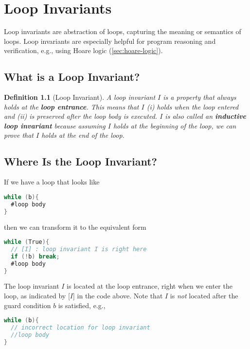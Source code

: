 \documentclass[oneside,11pt,dvipsnames]{book}
\newtheorem{definition}{Definition}[section]
\begin{document}

    

\chapter{Loop Invariants}

Loop invariants are abstraction of loops, capturing the meaning or semantics of loops. Loop invariants are especially helpful for program reasoning and verification, e.g., using Hoare logic (\autoref{sec:hoare-logic}).


\section{What is a Loop Invariant?}\label{what-is-a-loop-invariant}

\begin{definition}[Loop Invariant]
A loop invariant $I$ is a property that always holds at the
\textbf{loop entrance}. This means that $I$ (i) holds when the
loop entered and (ii) is preserved after the loop body is executed. $I$ is also called an \textbf{inductive loop invariant} because assuming $I$ holds at the beginning of the loop, we can prove that $I$ holds at the end of the loop.
\end{definition}
\section{Where Is the Loop Invariant?}\label{where-is-the-loop-invariant}

If we have a loop that looks like

\begin{lstlisting}[language=C]
while (b){
  #loop body
}
\end{lstlisting}

\noindent then we can transform it to the equivalent form
\begin{lstlisting}[language=C]
while (True){
  // [I] : loop invariant I is right here
  if (!b) break;
  #loop body
}
\end{lstlisting}

The loop invariant $I$ is located at the loop entrance, right when we enter the loop, as
indicated by [$I$] in the code above.
Note that $I$ is \emph{not} located after the guard
condition $b$ is satisfied, e.g.,
\begin{lstlisting}[language=C]
while (b){
  // incorrect location for loop invariant
  //loop body
}
\end{lstlisting}
\end{document}

